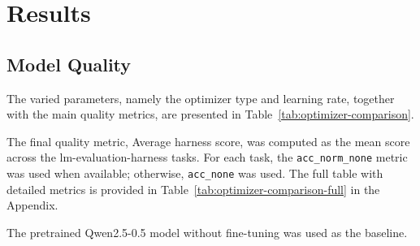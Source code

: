 \documentclass{article}
\begin{document}
\section{Results}
\subsection{Model Quality}

The varied parameters, namely the optimizer type and learning rate, together with the main quality metrics, are presented in Table~\ref{tab:optimizer-comparison}.

The final quality metric, Average harness score, was computed as the mean score across the lm-evaluation-harness tasks. For each task, the \texttt{acc\_norm\_none} metric was used when available; otherwise, \texttt{acc\_none} was used. The full table with detailed metrics is provided in Table~\ref{tab:optimizer-comparison-full} in the Appendix.

The pretrained Qwen2.5-0.5 model without fine-tuning was used as the baseline.

\begin{table}[ht]
\centering
\small
{}
\caption{Main quality metrics}
\label{tab:optimizer-comparison}
\end{table}
\end{document}
